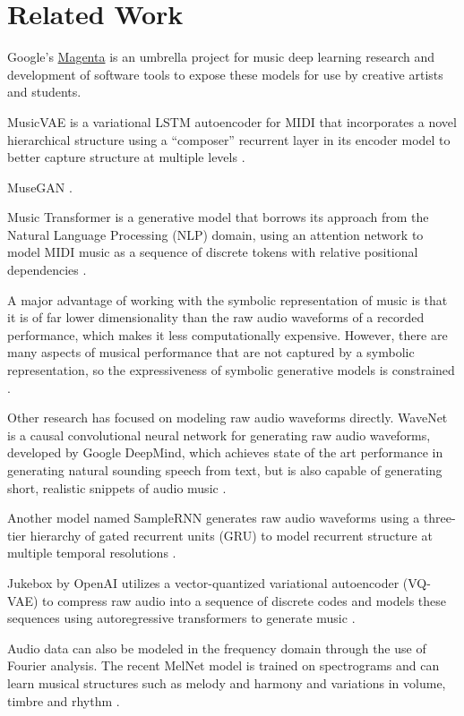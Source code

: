 \documentclass[sigconf,authorversion]{acmart}
\begin{document}
\section{Related Work}

Google's \href{https://magenta.tensorflow.org/}{Magenta} is an umbrella project
for music deep learning research and development of software tools to expose
these models for use by creative artists and students.

MusicVAE is a variational LSTM autoencoder for MIDI that incorporates a
novel hierarchical structure using a ``composer'' recurrent layer in its encoder
model to better capture structure at multiple
levels \cite{roberts_hierarchical_2018}.

MuseGAN  \cite{dong2017musegan}.

Music Transformer is a generative model that borrows its approach from the
Natural Language Processing (NLP) domain, using an attention network to model
MIDI music as a sequence of discrete tokens with relative positional dependencies
\cite{huang_music_2018}.

A major advantage of working with the symbolic representation of music is that
it is of far lower dimensionality than the raw audio waveforms of a recorded
performance, which makes it less computationally expensive. However, there are
many aspects of musical performance that are not captured by a symbolic
representation, so the expressiveness of symbolic generative models is
constrained \cite{manzelli_conditioning_2018}.

Other research has focused on modeling raw audio waveforms directly. WaveNet is
a causal convolutional neural network for generating raw audio waveforms,
developed by Google DeepMind, which achieves state of the art performance in
generating natural sounding speech from text, but is also capable of generating
short, realistic snippets of audio music \cite{oord_wavenet_2016}.

Another model named SampleRNN generates raw audio waveforms using a three-tier
hierarchy of gated recurrent units (GRU) to model recurrent structure at
multiple temporal resolutions \cite{mehri_samplernn_2017}.

Jukebox by OpenAI utilizes a vector-quantized variational autoencoder (VQ-VAE)
to compress raw audio into a sequence of discrete codes and models these
sequences using autoregressive transformers to generate music
\cite{dhariwal2020jukebox}.

Audio data can also be modeled in the frequency domain through the use of
Fourier analysis. The recent MelNet model is trained on spectrograms and can
learn musical structures such as melody and harmony and variations in volume,
timbre and rhythm \cite{vasquez2019melnet}.
\end{document}
